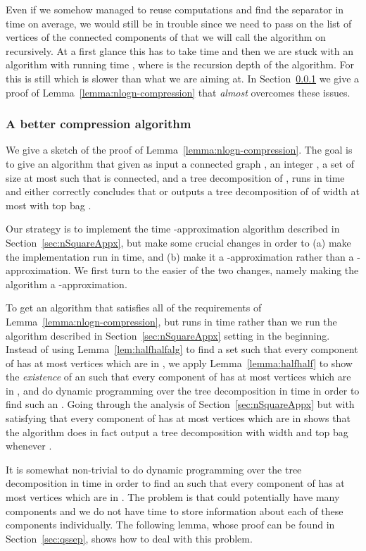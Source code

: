 \documentclass[a4paper,11pt]{article}
\theoremstyle{definition}
\theoremstyle{remark}
\begin{document}
Even if we somehow managed to reuse computations and find the
separator  in time  on average, we
would still be in trouble since we need to pass on the list of
vertices of the connected components of  that we will
call the algorithm on recursively.  At a first glance this has to take
 time and then we are stuck with an algorithm with running time
, where  is the
recursion depth of the algorithm.  For  this is still
 which is slower than what we are aiming at.  In
Section~\ref{sec:proofOfCompress} we give a proof of
Lemma~\ref{lemma:nlogn-compression} that {\em almost} overcomes these
issues.

\subsubsection{A better compression algorithm}
\label{sec:proofOfCompress}
We give a sketch of the proof of Lemma~\ref{lemma:nlogn-compression}.
The goal is to give an algorithm that given as input a connected graph
, an integer , a set  of size at most  such that
 is connected, and a tree decomposition  of
, runs in time  and either correctly concludes that
 or outputs a tree decomposition of  of width at most
 with top bag .

Our strategy is to implement the  time -approximation
algorithm described in Section~\ref{sec:nSquareAppx}, but make some
crucial changes in order to (a) make the implementation run in
 time, and (b) make it a -approximation rather than
a -approximation.  We first turn to the easier of the two changes,
namely making the algorithm a -approximation.

To get an algorithm that satisfies all of the requirements of
Lemma~\ref{lemma:nlogn-compression}, but runs in time 
rather than  we run the algorithm described in
Section~\ref{sec:nSquareAppx} setting  in the beginning.
Instead of using Lemma~\ref{lem:halfhalfalg} to find a set  such
that every component of  has at most 
vertices which are in , we apply Lemma~\ref{lemma:halfhalf} to show
the {\em existence} of an  such that every component of  has at most  vertices which are in ,
and do dynamic programming over the tree decomposition  in
time  in order to find such an .  Going through the
analysis of Section~\ref{sec:nSquareAppx} but with  satisfying that
every component of  has at most 
vertices which are in  shows that the algorithm does in fact output
a tree decomposition with width  and top bag  whenever
.

It is somewhat non-trivial to do dynamic programming over the tree
decomposition  in time  in order to find an 
such that every component of  has at most
 vertices which are in .  The problem is that  could potentially have many components and we do not have
time to store information about each of these components individually.
The following lemma, whose proof can be found in
Section~\ref{sec:qssep}, shows how to deal with this problem.
\end{document}
